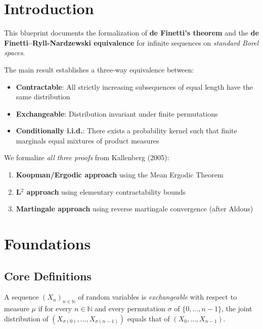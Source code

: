 
\chapter{Introduction}

This blueprint documents the formalization of \textbf{de Finetti's theorem} and the
\textbf{de Finetti--Ryll-Nardzewski equivalence} for infinite sequences on \emph{standard Borel spaces}.

The main result establishes a three-way equivalence between:
\begin{itemize}
  \item \textbf{Contractable}: All strictly increasing subsequences of equal length have the same distribution
  \item \textbf{Exchangeable}: Distribution invariant under finite permutations
  \item \textbf{Conditionally i.i.d.}: There exists a probability kernel such that finite marginals equal mixtures of product measures
\end{itemize}

We formalize \emph{all three proofs} from Kallenberg (2005):
\begin{enumerate}
  \item \textbf{Koopman/Ergodic approach} using the Mean Ergodic Theorem
  \item \textbf{L$^2$ approach} using elementary contractability bounds
  \item \textbf{Martingale approach} using reverse martingale convergence (after Aldous)
\end{enumerate}


\chapter{Foundations}

\section{Core Definitions}

\begin{definition}
  \label{def:exchangeable}
  \leanok
  A sequence $(X_n)_{n \in \mathbb{N}}$ of random variables is \emph{exchangeable}
  with respect to measure $\mu$ if for every $n \in \mathbb{N}$ and every permutation
  $\sigma$ of $\{0, \ldots, n-1\}$, the joint distribution of $(X_{\sigma(0)}, \ldots, X_{\sigma(n-1)})$
  equals that of $(X_0, \ldots, X_{n-1})$.
\end{definition}

